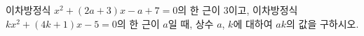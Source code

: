 이차방정식 $x^2+(2a+3)x-a+7=0$의 한 근이 $3$이고, 이차방정식 $kx^2+(4k+1)x-5=0$의 한 근이 $a$일 때, 상수 $a$, $k$에 대하여 $ak$의 값을 구하시오.
